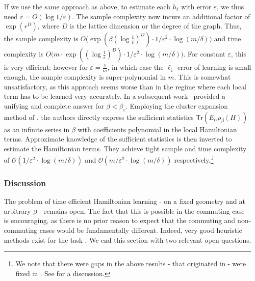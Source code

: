 \documentclass[11pt]{article}
\newcommand{\Tr}{\textsf{Tr}}
\begin{document}
If we use the same approach as above, to estimate each $h_\ell$ with error $\varepsilon$, we thus need $r=O(\log 1/\varepsilon)$. The sample complexity now incurs an additional factor of $\exp(r^D)$, where $D$ is the lattice dimension or the degree of the graph. Thus, the sample complexity is
$O\Big(\exp({\beta (\log\frac{1}{\varepsilon})^D})\cdot 1/{\varepsilon^2}\cdot \log ({m}/{\delta})\Big)$  
and time complexity is 
$O\Big(m\cdot \exp({(\log\frac{1}{\varepsilon})^D})\cdot 1/{\varepsilon^2}\cdot \log({m}/{\delta})\Big)$. For constant $\varepsilon$, this is very efficient; however for $\varepsilon=\frac{1}{m}$, in which case the $\ell_1$ error of learning is small enough, the sample complexity is super-polynomial in $m$. This is somewhat unsatisfactory, as this approach seems worse than \cite{anshu2021sample} in the regime where each local term has to be learned very accurately. In a subsequent work~\cite{haah2021optimal} provided a unifying and complete answer for $\beta<\beta_c$. Employing the cluster expansion method of \cite{KKB20, KS20}, the authors directly express the sufficient statistics $\Tr(E_\alpha \rho_{\beta}(H))$ as an infinite series in $\beta$ with coefficients polynomial in the local Hamiltonian terms. Approximate knowledge of the sufficient statistics is then inverted to estimate the Hamiltonian terms. They achieve tight sample and time complexity of
$\mathcal{O}\left(1/\varepsilon^2 \cdot \log ({m}/{\delta})\right)$ {and} $\mathcal{O}\left(m/\varepsilon^2\cdot \log ({m}/{\delta})\right)$ respectively.\footnote{We note that there were gaps in the above results - that originated in \cite{KS20} - were fixed in \cite{WildA22}. See \cite{haah2021optimal} for a discussion.}

\subsubsection{Discussion}

The problem of time efficient Hamiltonian learning - on a fixed geometry and at arbitrary $\beta$ - remains open. The fact that this is possible in the commuting case is encouraging, as there is no prior reason to expect that the commuting and non-commuting cases would be fundamentally different. Indeed, very good heuristic methods exist for the task \cite{Aradlearning, Qi2019learningFromGroundState}. We end this section with two relevant open questions.
\end{document}
